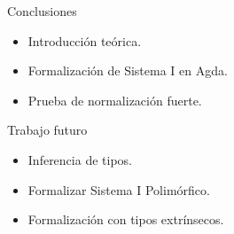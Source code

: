 \begin{frame}{Conclusiones}

	\begin{itemize}[<+->]
		\item Introducción teórica.
		\item Formalización de Sistema I en Agda.
		\item Prueba de normalización fuerte.
	\end{itemize}
	
\end{frame}

\begin{frame}{Trabajo futuro}
	
	\begin{itemize}[<+->]
		\item Inferencia de tipos.
		\item Formalizar Sistema I Polimórfico.
		\item Formalización con tipos extrínsecos.
	\end{itemize}
	
\end{frame}